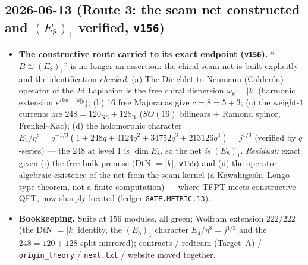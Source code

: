 \documentclass[11pt]{article}
\providecommand{\vref}[1]{\texttt{#1}}
\begin{document}
\subsection*{2026-06-13 (Route 3: the seam net constructed and $(E_8)_1$ verified, \vref{v156})}
\begin{itemize}
\item \textbf{The constructive route carried to its exact endpoint (\vref{v156}).} ``$B\cong(E_8)_1$''
  is no longer an assertion: the chiral seam net is built explicitly and the identification \emph{checked}.
  (a) The Dirichlet-to-Neumann (Calder\'on) operator of the $2$d Laplacian is the free chiral dispersion
  $\omega_k=|k|$ (harmonic extension $e^{ikx-|k|y}$); (b) $16$ free Majoranas give $c=8=5{+}3$; (c) the
  weight-$1$ currents are $248=120_{\mathrm{NS}}+128_{\mathrm R}$ ($SO(16)$ bilinears $+$ Ramond spinor,
  Frenkel--Kac); (d) the holomorphic character $E_4/\eta^8=q^{-1/3}(1+248q+4124q^2+34752q^3+213126q^4)
  =j^{1/3}$ (verified by $q$-series) --- the $248$ at level $1$ is $\dim E_8$, so the net \emph{is}
  $(E_8)_1$. \emph{Residual:} exact given (i) the free-bulk premise (DtN $=|k|$, \vref{v155}) and (ii) the
  operator-algebraic existence of the net from the seam kernel (a Kawahigashi--Longo-type theorem, not a
  finite computation) --- where TFPT meets constructive QFT, now sharply located (ledger
  \texttt{GATE.METRIC.13}).
\item \textbf{Bookkeeping.} Suite at $156$ modules, all green; Wolfram extension $222/222$ (the DtN $=|k|$
  identity, the $(E_8)_1$ character $E_4/\eta^8=j^{1/3}$ and the $248{=}120{+}128$ split mirrored);
  contracts / redteam (Target~A) / \texttt{origin\_theory} / \texttt{next.txt} / website moved together.
\end{itemize}
\end{document}
